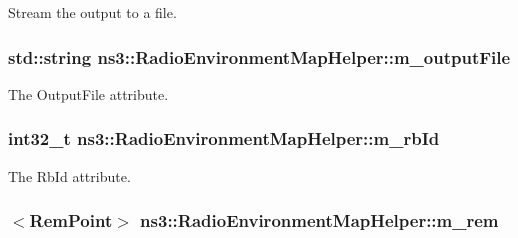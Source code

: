 Stream the output to a file. 

\subsubsection[{\texorpdfstring{m\+\_\+output\+File}{m_outputFile}}]{\setlength{\rightskip}{0pt plus 5cm}std\+::string ns3\+::\+Radio\+Environment\+Map\+Helper\+::m\+\_\+output\+File\hspace{0.3cm}{\ttfamily [private]}}\hypertarget{classns3_1_1RadioEnvironmentMapHelper_a4ed6a97a3aa3011388fdc771af50ae66}{}\label{classns3_1_1RadioEnvironmentMapHelper_a4ed6a97a3aa3011388fdc771af50ae66}


The {\ttfamily Output\+File} attribute. 

\subsubsection[{\texorpdfstring{m\+\_\+rb\+Id}{m_rbId}}]{\setlength{\rightskip}{0pt plus 5cm}int32\+\_\+t ns3\+::\+Radio\+Environment\+Map\+Helper\+::m\+\_\+rb\+Id\hspace{0.3cm}{\ttfamily [private]}}\hypertarget{classns3_1_1RadioEnvironmentMapHelper_a380539755840ad027fadec5d78b58ae5}{}\label{classns3_1_1RadioEnvironmentMapHelper_a380539755840ad027fadec5d78b58ae5}


The {\ttfamily Rb\+Id} attribute. 

\subsubsection[{\texorpdfstring{m\+\_\+rem}{m_rem}}]{$<${\bf Rem\+Point}$>$ ns3\+::\+Radio\+Environment\+Map\+Helper\+::m\+\_\+rem\hspace{0.3cm}{\ttfamily [private]}}\hypertarget{classns3_1_1RadioEnvironmentMapHelper_a352fbdfaf6238d989c45ba5630a11c90}{}\label{classns3_1_1RadioEnvironmentMapHelper_a352fbdfaf6238d989c45ba5630a11c90}


